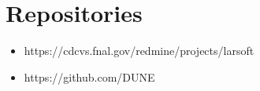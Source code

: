 \chapter{Repositories}

\begin{itemize}
\item https://cdcvs.fnal.gov/redmine/projects/larsoft
\item https://github.com/DUNE
\end{itemize}